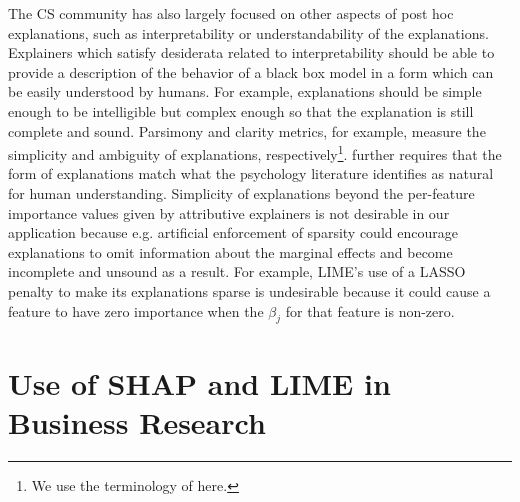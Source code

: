\documentclass[mnsc,blindrev]{informs3}
\begin{document}
  The CS community has also largely focused on other aspects of post hoc explanations, such as interpretability or understandability of the explanations.   Explainers which satisfy desiderata related to  interpretability should be able to provide a description of the behavior of a black box model in a form which can be easily understood by humans. For example, explanations should be simple enough to be intelligible but complex enough so that the explanation is still complete and sound. Parsimony \citep{nguyen2020quantitative} and clarity \citep{lakkaraju2017interpretable,montavon2018methods,alvarez18robustness} metrics, for example, measure the simplicity and ambiguity of explanations, respectively\footnote{We use the terminology of \cite{markus2021role} here.}. \cite{jacovi2023diagnosing} further requires that the form of explanations match what the psychology literature identifies as natural for human understanding.  Simplicity of explanations beyond the per-feature importance values given by attributive explainers is not desirable in our application because e.g. artificial enforcement of sparsity could encourage explanations to omit information about the marginal effects and become incomplete and unsound as a result. For example, LIME's use of a LASSO penalty to make its explanations sparse is undesirable because it could cause a feature to have zero importance when the $\beta_j$ for that feature is non-zero. %

    
   
    
    
    \section{Use of SHAP and LIME in Business Research}
\end{document}
